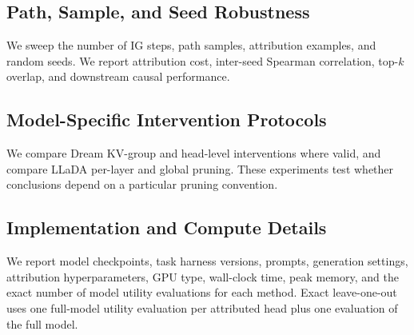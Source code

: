 \subsection{Path, Sample, and Seed Robustness}
\label{app:robustness}

We sweep the number of IG steps, path samples, attribution examples, and random seeds. We report attribution cost, inter-seed Spearman correlation, top-$k$ overlap, and downstream causal performance.

\subsection{Model-Specific Intervention Protocols}
\label{app:intervention_protocols}

We compare Dream KV-group and head-level interventions where valid, and compare LLaDA per-layer and global pruning. These experiments test whether conclusions depend on a particular pruning convention.

\subsection{Implementation and Compute Details}
\label{app:implementation}

We report model checkpoints, task harness versions, prompts, generation settings, attribution hyperparameters, GPU type, wall-clock time, peak memory, and the exact number of model utility evaluations for each method. Exact leave-one-out uses one full-model utility evaluation per attributed head plus one evaluation of the full model.
